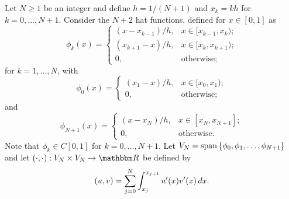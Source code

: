 \vspace*{.5em}

Let $N\ge 1$ be an integer and define $h = 1/(N + 1)$ and $x_k = kh$ for $k = 0,\ldots,N + 1$. Consider the $N+2$ hat functions, defined for $x\in[0,1]$ as
\[
\phi_k(x) = \left\{\begin{array}{ll}
(x-x_{k-1})/h, & x\in[x_{k-1},x_k);\\
(x_{k+1}-x)/h, & x\in[x_k,x_{k+1});\\
0,& \mbox{otherwise;}
\end{array}\right.
\]
for $k=1,\ldots, N$, with
\[
\phi_0(x) = \left\{\begin{array}{ll}
(x_1-x)/h, & x\in[x_0,x_1);\\
0,& \mbox{otherwise;}
\end{array}\right.
\]
and
\[
\phi_{N+1}(x) = \left\{\begin{array}{ll}
(x-x_N)/h, & x\in[x_N,x_{N+1}];\\
0,& \mbox{otherwise.}
\end{array}\right.
\]
Note that $\phi_k\in C[0,1]$ for $k = 0,\ldots,N + 1$. Let $V_N={\rm span}\left\{\phi_0,\phi_1,\ldots,\phi_{N+1}\right\}$ and let $\ip{\cdot,\cdot}:V_N\times V_N\to\R$ be defined by
\[
(u,v)=\sum_{j=0}^N\int_{x_j}^{x_{j+1}}u'(x)v'(x)\,dx.
\]

